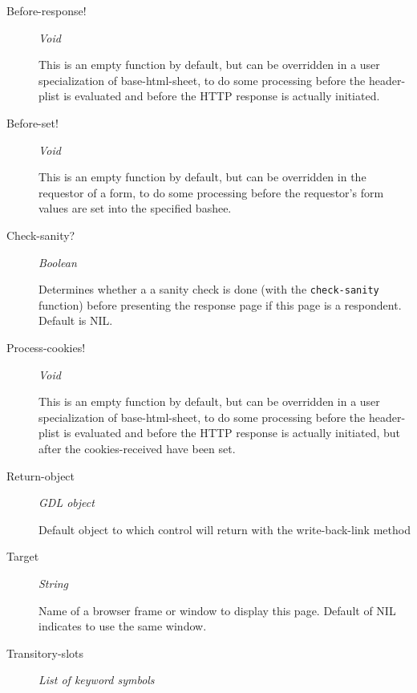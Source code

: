 \documentclass [11pt]{book}
\begin{document}
\begin{itemize}
\begin{description}
\item [Before-response!]
\emph{Void}

 This is an empty function by default, but can be overridden in
a user specialization of base-html-sheet, to do some processing before the
header-plist is evaluated and before the HTTP response is actually initiated.




\item [Before-set!]
\emph{Void}

 This is an empty function by default, but can be overridden in
the requestor of a form, to do some processing before the requestor's form
values are set into the specified bashee.




\item [Check-sanity?]
\emph{Boolean}

 Determines whether a a sanity check is done (with the \texttt{check-sanity} function) before
presenting the response page if this page is a respondent. Default is NIL.




\item [Process-cookies!]
\emph{Void}

 This is an empty function by default, but can be overridden in
a user specialization of base-html-sheet, to do some processing before the
header-plist is evaluated and before the HTTP response is actually initiated, but after
the cookies-received have been set.




\item [Return-object]
\emph{GDL object}

 Default object to which control will return with the write-back-link method




\item [Target]
\emph{String}

 Name of a browser frame or window to display this page. Default of NIL indicates to use the same window.




\item [Transitory-slots]
\emph{List of keyword symbols}


\end{description}
\end{itemize}
\end{document}
